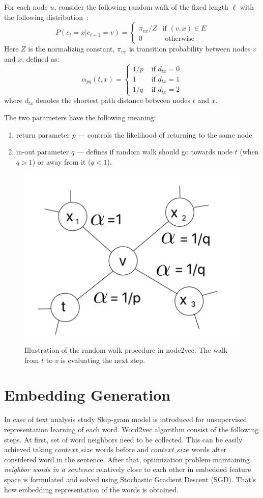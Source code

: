 For each node $u$, consider the following random walk of the fixed length $\ell$ with the following distribution~\cite{DBLP:journals/corr/abs-1011-4071}:
\begin{equation*}
P(c_i = x|c_{i-1} = v) =
 \begin{cases}
   \pi_{vx}/Z &\text{if $(v,x)\in E$}\\
   0 &\text{ otherwise}
 \end{cases}
\end{equation*}
Here $Z$ is the normalizing constant, $\pi_{vx}$ is transition probability between nodes $v$ and $x$, defined as: 
\[ 
  \alpha _{pq}(t, x) = \begin{cases}
   1/p &\text{ if $d_{tx} = 0$}\\
   1   &\text{ if $d_{tx} = 1$}\\
   1/q &\text{ if $d_{tx} = 2$}
   \end{cases}
\]
where $d_{tx}$ denotes the shortest path distance between nodes $t$ and $x$.


The two parameters have the following meaning:

\begin{enumerate}
    \item return parameter $p$ --- controls the likelihood of returning to the same node
    \item in-out parameter $q$ --- defines if random walk should go towards node $t$ (when $q > 1$) or away from it ($q < 1$).
\end{enumerate}

\begin{figure}[H]   \centering
    \includegraphics[width=0.5\linewidth]{plots/image2.png}
    \caption{Illustration   of   the   random   walk   procedure in node2vec. The walk from $t$ to $v$ is evaluating the next step.}
    \label{fig:my_label3}
\end{figure}

\section{Embedding Generation}
In case of text analysis study\cite{mikolov2013efficient} Skip-gram model is introduced for unsupervised representation learning of each word. Word2vec algorithm consist of the following steps. At first, set of word neighbors need to be collected. This can be easily achieved taking $context\_size$ words before and $context\_size$ words after considered word in the sentence. After that, optimization problem maintaining \textit{neighbor words in a sentence} relatively close to each other in embedded feature space is formulated and solved using Stochastic Gradient Descent (SGD). That's how embedding representation of the words is obtained. 

